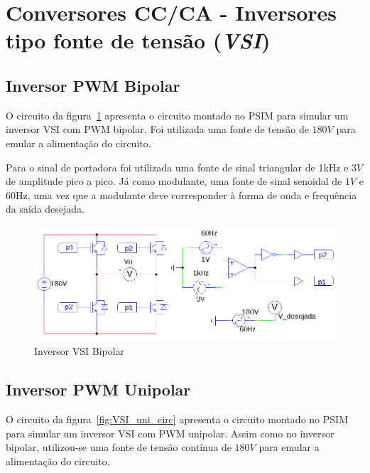 \documentclass[
	12pt,				%
	openany,
	onseside,
	a4paper,			%
	english,			%
	french,				%
	spanish,			%
	brazil,				%
	]{abntex2}
\begin{document}
\section{Conversores CC/CA - Inversores tipo fonte de tensão (\textit{VSI})}\label{sec:met_conv_cc_ca}

\subsection{Inversor PWM Bipolar}

O circuito da figura~\ref{fig:VSI_bip_circ} apresenta o circuito montado no PSIM para simular um inversor VSI com PWM bipolar. Foi utilizada uma fonte de tensão de $180V$ para emular a alimentação do circuito.

Para o sinal de portadora foi utilizada uma fonte de sinal triangular de 1kHz e $3V$ de amplitude pico a pico. Já como modulante, uma fonte de sinal senoidal de $1V$ e 60Hz, uma vez que a modulante deve corresponder à forma de onda e frequência da saída desejada.

\begin{figure}[htpb]%
	\centering%
		\includegraphics[width=0.8 \linewidth]{vsi_bipolar_psim_circ}
		\caption{Inversor VSI Bipolar}
		\label{fig:VSI_bip_circ}
\end{figure}

\subsection{Inversor PWM Unipolar}

O circuito da figura~\ref{fig:VSI_uni_circ} apresenta o circuito montado no PSIM para simular um inversor VSI com PWM unipolar. Assim como no inversor bipolar, utilizou-se uma fonte de tensão contínua de $180V$ para emular a alimentação do circuito.
\end{document}
